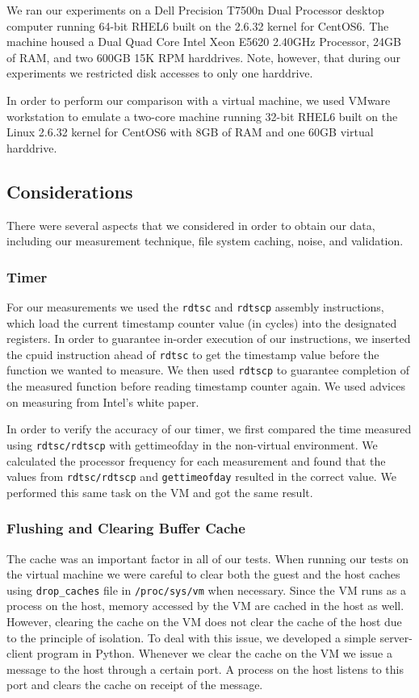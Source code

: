 We ran our experiments on a Dell Precision T7500n Dual Processor desktop 
computer running 64-bit RHEL6 built on the 2.6.32 kernel for CentOS6. The 
machine housed a Dual Quad Core Intel\textsuperscript{\textregistered} 
Xeon\textsuperscript{\textregistered} E5620 2.40GHz Processor, 24GB of RAM, 
and two 600GB 15K RPM harddrives. Note, however, that during our experiments 
we restricted disk accesses to only one harddrive.

In order to perform our comparison with a virtual machine, we used VMware 
workstation to emulate a two-core machine running 32-bit RHEL6 built on the 
Linux 2.6.32 kernel for CentOS6 with 8GB of RAM and one 60GB virtual harddrive.

\subsection{Considerations}
There were several aspects that we considered in order to obtain our data, 
including our measurement technique, file system caching, noise, and validation.

\subsubsection{Timer}
For our measurements we used the \texttt{rdtsc} and \texttt{rdtscp} assembly instructions, which load 
the current timestamp counter value (in cycles) into the designated registers. In 
order to guarantee in-order execution of our instructions, we inserted the cpuid 
instruction ahead of \texttt{rdtsc} to get the timestamp value before the function we wanted 
to measure. We then used \texttt{rdtscp} to guarantee completion of the measured function 
before reading timestamp counter again. We used advices on measuring from Intel's white paper\cite{rdtsc}.

In order to verify the accuracy of our timer, we first compared the time measured 
using \texttt{rdtsc/rdtscp} with gettimeofday in the non-virtual environment. We calculated
the processor frequency for each measurement and found that the values from 
\texttt{rdtsc/rdtscp} and \texttt{gettimeofday} resulted in the correct value. We performed this 
same task on the VM and got the same result.

\subsubsection{Flushing and Clearing Buffer Cache}
The cache was an important factor in all of our tests. When running our tests on the
virtual machine we were careful to clear both the guest and the host caches using 
\texttt{drop\_caches} file in \texttt{/proc/sys/vm} when necessary. Since the VM runs as a process on the host, memory 
accessed by the VM are cached in the host as well. However, clearing the cache on the VM 
does not clear the cache of the host due to the principle of isolation. To deal with this
issue, we developed a simple server-client program in Python. Whenever we clear the cache on the VM
 we issue a message to the host through a certain port. A process on the host listens to this port and clears the cache on
receipt of the message.

